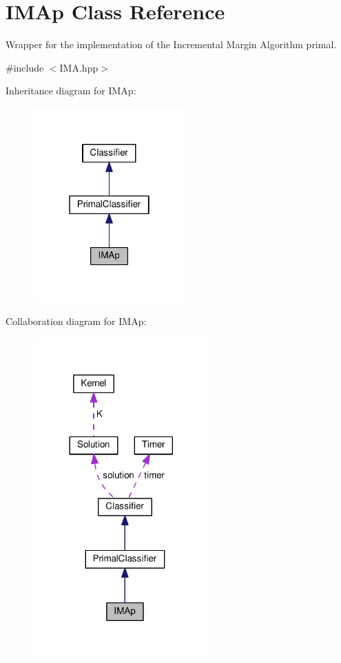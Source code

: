 \hypertarget{class_i_m_ap}{}\section{I\+M\+Ap Class Reference}
\label{class_i_m_ap}


Wrapper for the implementation of the Incremental Margin Algorithm primal.  




{\ttfamily \#include $<$I\+M\+A.\+hpp$>$}



Inheritance diagram for I\+M\+Ap\+:\nopagebreak
\begin{figure}[H]
\begin{center}
\leavevmode
\includegraphics[width=166pt]{class_i_m_ap__inherit__graph}
\end{center}
\end{figure}


Collaboration diagram for I\+M\+Ap\+:\nopagebreak
\begin{figure}[H]
\begin{center}
\leavevmode
\includegraphics[width=192pt]{class_i_m_ap__coll__graph}
\end{center}
\end{figure}
